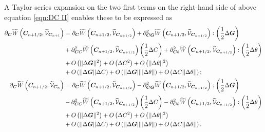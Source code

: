 A Taylor series expansion on the two first terms on the right-hand side of above equation \eqref{eqn:DC II} enables these to be expressed as
%
\begin{equation}\label{eqn:Taylor expansion around SiamgC}
\begin{aligned}
\partial_{\vect{C}}\widetilde{W}\left(\vect{C}_{n+1/2},\widetilde{\mathcal{V}}_{\vect{C}_{n+1}}\right) & = \partial_{\vect{C}}\widetilde{W}\left(\vect{C}_{n+1/2},\widetilde{\mathcal{V}}_{\vect{C}_{n+1/2}}\right)
%
+{\partial_{\vect{CG}}^2 \widetilde{W}\left(\vect{C}_{n+1/2},\widetilde{\mathcal{V}}_{\vect{C}_{n+1/2}}\right)}:\left(\frac{1}{2}\Delta\vect{G}\right)\\
%
&+{\partial_{\vect{C}C}^2 \widetilde{W}\left(\vect{C}_{n+1/2},\widetilde{\mathcal{V}}_{\vect{C}_{n+1/2}}\right)}\left(\frac{1}{2}\Delta{C}\right)
%
+{\partial_{\vect{C}\theta}^2 \widetilde{W}\left(\vect{C}_{n+1/2},\widetilde{\mathcal{V}}_{\vect{C}_{n+1/2}}\right)}:\left(\frac{1}{2}\Delta\theta\right)\\
%
&+O\left(\vert\vert\Delta\vect{G}\vert\vert^2\right)+
O\left(\Delta{C}^2\right)+
O\left(\vert\vert\Delta\theta\vert\vert^2\right)\\& + 
O\left(\vert\vert\Delta\vect{G}\vert\vert\Delta C\right) + 
O\left(\vert\vert\Delta\vect{G}\vert\vert\vert\vert\Delta\theta\vert\vert\right) 
 + 
 O\left(\Delta C\vert\vert\Delta\theta\vert\vert\right);\\
\partial_{\vect{C}}\widetilde{W}\left(\vect{C}_{n+1/2},\widetilde{\mathcal{V}}_{\vect{C}_{n}}\right) & = \partial_{\vect{C}}\widetilde{W}\left(\vect{C}_{n+1/2},\widetilde{\mathcal{V}}_{\vect{C}_{n+1/2}}\right)
%
-{\partial_{\vect{CG}}^2 \widetilde{W}\left(\vect{C}_{n+1/2},\widetilde{\mathcal{V}}_{\vect{C}_{n+1/2}}\right)}:\left(\frac{1}{2}\Delta\vect{G}\right)\\
%
&-{\partial_{\vect{C}C}^2 \widetilde{W}\left(\vect{C}_{n+1/2},\widetilde{\mathcal{V}}_{\vect{C}_{n+1/2}}\right)}\left(\frac{1}{2}\Delta{C}\right)
%
-{\partial_{\vect{C}\theta}^2 \widetilde{W}\left(\vect{C}_{n+1/2},\widetilde{\mathcal{V}}_{\vect{C}_{n+1/2}}\right)}:\left(\frac{1}{2}\Delta\theta\right)\\
%
&+O\left(\vert\vert\Delta\vect{G}\vert\vert^2\right)+
O\left(\Delta{C}^2\right)+
O\left(\vert\vert\Delta\theta\vert\vert^2\right)\\& + 
O\left(\vert\vert\Delta\vect{G}\vert\vert\Delta C\right) + 
O\left(\vert\vert\Delta\vect{G}\vert\vert\vert\vert\Delta\theta\vert\vert\right) 
+ 
O\left(\Delta C\vert\vert\Delta\theta\vert\vert\right). 
%
\end{aligned}
\end{equation}
	
